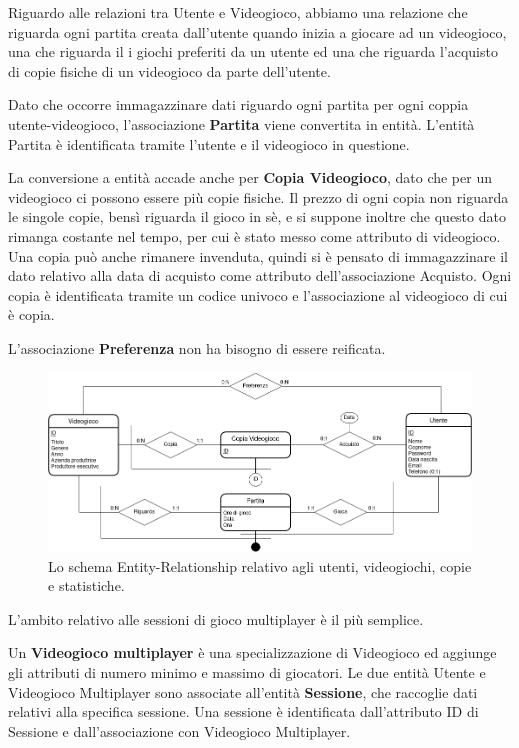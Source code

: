 \documentclass[a4paper,12pt]{report}
\begin{document}
Riguardo alle relazioni tra Utente e Videogioco, abbiamo una relazione che riguarda ogni partita creata dall'utente quando inizia a giocare ad un videogioco, una che riguarda il i giochi preferiti da un utente ed una che riguarda l'acquisto di copie fisiche di un videogioco da parte dell'utente.

Dato che occorre immagazzinare dati riguardo ogni partita per ogni coppia utente-videogioco, l'associazione \textbf{Partita} viene convertita in entità. L'entità Partita è identificata tramite l'utente e il videogioco in questione.

La conversione a entità accade anche per \textbf{Copia Videogioco}, dato che per un videogioco ci possono essere più copie fisiche. Il prezzo di ogni copia non riguarda le singole copie, bensì riguarda il gioco in sè, e si suppone inoltre che questo dato rimanga costante nel tempo, per cui è stato messo come attributo di videogioco. Una copia può anche rimanere invenduta, quindi si è pensato di immagazzinare il dato relativo alla data di acquisto come attributo dell'associazione Acquisto. Ogni copia è identificata tramite un codice univoco e l'associazione al videogioco di cui è copia.

L'associazione \textbf{Preferenza} non ha bisogno di essere reificata.

\begin{figure}[!htb]
\centering{}
\includegraphics[width=\textwidth]{vg.png}
\caption{Lo schema Entity-Relationship relativo agli utenti, videogiochi, copie e statistiche.}
\label{img:schema_vg}
\end{figure}

L'ambito relativo alle sessioni di gioco multiplayer è il più semplice.

Un \textbf{Videogioco multiplayer} è una specializzazione di Videogioco ed aggiunge gli attributi di numero minimo e massimo di giocatori. Le due entità Utente e Videogioco Multiplayer sono associate all'entità \textbf{Sessione}, che raccoglie dati relativi alla specifica sessione. Una sessione è identificata dall'attributo ID di Sessione e dall'associazione con Videogioco Multiplayer.
\end{document}
